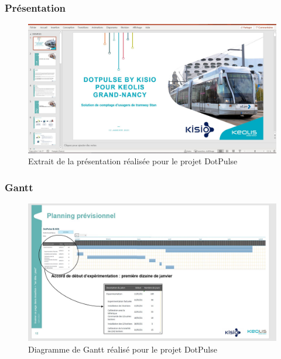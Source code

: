 \documentclass{article}
\begin{document}
        \subsubsection{Présentation}

            \label{DotPulse_Presentation}
            \begin{figure}[!h]
                \centering
                \includegraphics[scale = 0.4]{Images/DotPulse_presentation.JPG}
                \caption{Extrait de la présentation réalisée pour le projet DotPulse}
            \end{figure}
            
        \pagebreak
        \subsubsection{Gantt}

            \label{DotPulse_Gantt}
            \begin{figure}[!h]
                \centering
                \includegraphics[scale = 0.5]{Images/DotPulse_Gant.JPG}
                \caption{Diagramme de Gantt réalisé pour le projet DotPulse}
            \end{figure}
\end{document}
